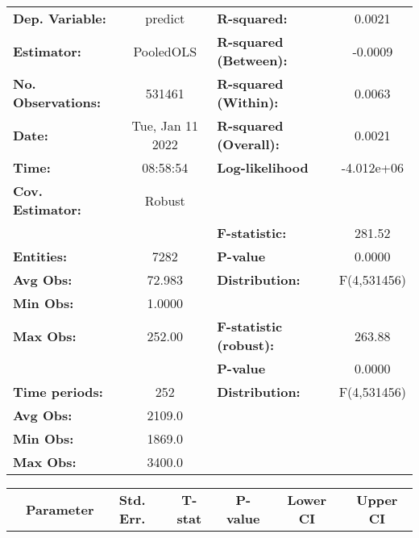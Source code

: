 \begin{center}
\begin{tabular}{lclc}
\toprule
\textbf{Dep. Variable:}    &      predict       & \textbf{  R-squared:         }   &      0.0021      \\
\textbf{Estimator:}        &     PooledOLS      & \textbf{  R-squared (Between):}  &     -0.0009      \\
\textbf{No. Observations:} &       531461       & \textbf{  R-squared (Within):}   &      0.0063      \\
\textbf{Date:}             &  Tue, Jan 11 2022  & \textbf{  R-squared (Overall):}  &      0.0021      \\
\textbf{Time:}             &      08:58:54      & \textbf{  Log-likelihood     }   &    -4.012e+06    \\
\textbf{Cov. Estimator:}   &       Robust       & \textbf{                     }   &                  \\
\textbf{}                  &                    & \textbf{  F-statistic:       }   &      281.52      \\
\textbf{Entities:}         &        7282        & \textbf{  P-value            }   &      0.0000      \\
\textbf{Avg Obs:}          &       72.983       & \textbf{  Distribution:      }   &   F(4,531456)    \\
\textbf{Min Obs:}          &       1.0000       & \textbf{                     }   &                  \\
\textbf{Max Obs:}          &       252.00       & \textbf{  F-statistic (robust):} &      263.88      \\
\textbf{}                  &                    & \textbf{  P-value            }   &      0.0000      \\
\textbf{Time periods:}     &        252         & \textbf{  Distribution:      }   &   F(4,531456)    \\
\textbf{Avg Obs:}          &       2109.0       & \textbf{                     }   &                  \\
\textbf{Min Obs:}          &       1869.0       & \textbf{                     }   &                  \\
\textbf{Max Obs:}          &       3400.0       & \textbf{                     }   &                  \\
\bottomrule
\end{tabular}
\begin{tabular}{lcccccc}
                & \textbf{Parameter} & \textbf{Std. Err.} & \textbf{T-stat} & \textbf{P-value} & \textbf{Lower CI} & \textbf{Upper CI}  \\

\end{tabular}
\end{center}

